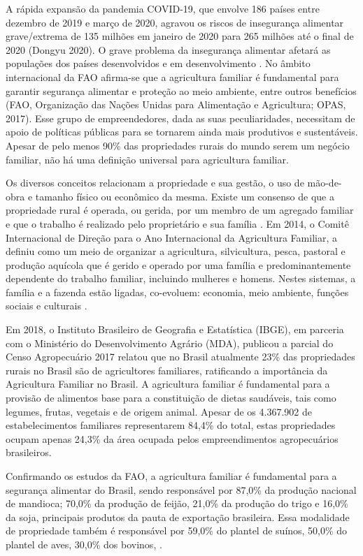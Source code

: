 A rápida expansão da pandemia COVID-19, que envolve 186 países entre dezembro de 2019 e março de 2020, agravou os riscos de insegurança alimentar grave/extrema de 135 milhões em janeiro de 2020 para 265 milhões até o final de 2020 (Dongyu 2020). O grave problema da insegurança alimentar afetará as populações dos países desenvolvidos e em desenvolvimento \cite{lal_home_2020}. No âmbito internacional da FAO afirma-se que a agricultura familiar é fundamental para garantir segurança alimentar e proteção ao meio ambiente, entre outros benefícios (FAO, Organização das Nações Unidas para Alimentação e Agricultura; OPAS, 2017). Esse grupo de empreendedores, dada as suas peculiaridades, necessitam de apoio de políticas públicas para se tornarem ainda mais produtivos e sustentáveis. Apesar de pelo menos 90\% das propriedades rurais do mundo serem um negócio familiar, não há uma definição universal para agricultura familiar.

Os diversos conceitos relacionam a propriedade e sua gestão, o uso de mão-de-obra e tamanho físico ou econômico da mesma. Existe um consenso de que a propriedade rural é operada, ou gerida, por um membro de um agregado familiar e que o trabalho é realizado pelo proprietário e sua família \cite{schneider_teoria_2003}. Em 2014, o Comitê Internacional de Direção para o Ano Internacional da Agricultura Familiar, a definiu como um meio de organizar a agricultura, silvicultura, pesca, pastoral e produção aquícola que é gerido e operado por uma família e predominantemente dependente do trabalho familiar, incluindo mulheres e homens. Nestes sistemas, a família e a fazenda estão ligadas, co-evoluem: economia, meio ambiente, funções sociais e culturais \cite{fao_innovation_2014}.

Em 2018, o Instituto Brasileiro de Geografia e Estatística (IBGE), em parceria com o Ministério do Desenvolvimento Agrário (MDA), publicou a parcial do Censo Agropecuário 2017 \cite{ibge_censo_2018} relatou que no Brasil atualmente 23\% das propriedades rurais no Brasil são de agricultores familiares, ratificando a importância da Agricultura Familiar no Brasil. A agricultura familiar é fundamental para a provisão de alimentos base para a constituição de dietas saudáveis, tais como legumes, frutas, vegetais e de origem animal. Apesar de os 4.367.902 de estabelecimentos familiares representarem 84,4\% do total, estas propriedades ocupam apenas 24,3\% da área ocupada pelos empreendimentos agropecuários brasileiros. 

Confirmando os estudos da FAO, a agricultura familiar é fundamental para a  segurança alimentar do Brasil, sendo responsável por 87,0\% da produção nacional de mandioca; 70,0\% da produção de feijão, 21,0\% da produção do trigo e 16,0\% da soja, principais produtos da pauta de exportação brasileira. Essa modalidade de propriedade também é responsável por 59,0\% do plantel de suínos, 50,0\% do plantel de aves, 30,0\% dos bovinos, \cite{ibge_censo_2018}.


